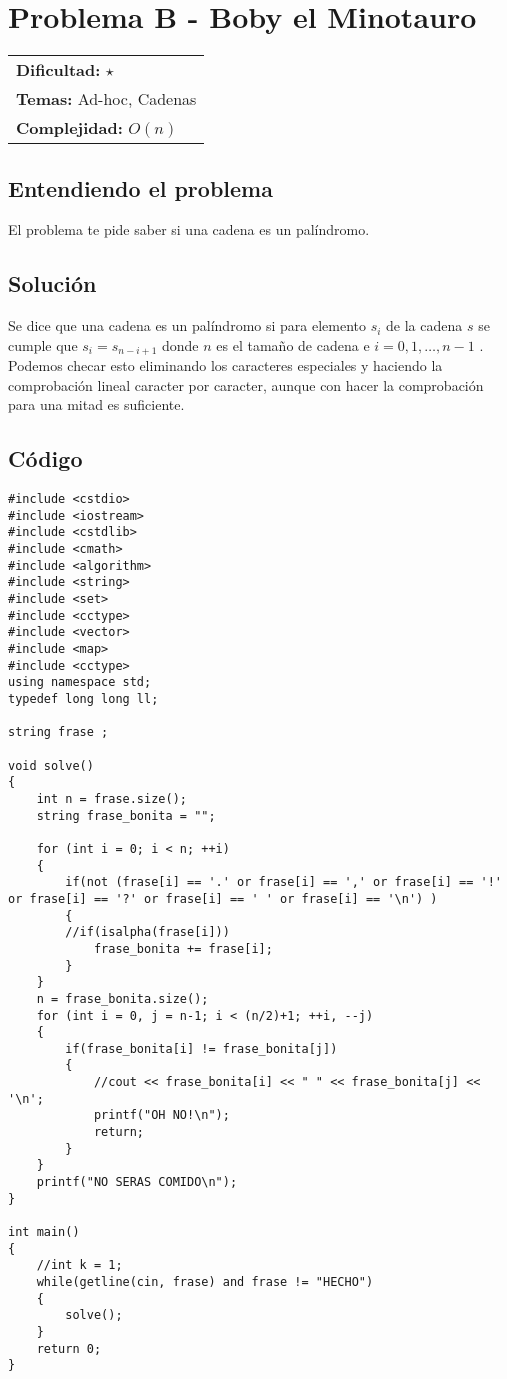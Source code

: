 \section{Problema B - Boby el Minotauro}

\hfill
\begin{tabular}{@{}l@{}}
\textbf{Dificultad:} $\star$ \\
\textbf{Temas:} Ad-hoc, Cadenas \\
\textbf{Complejidad:} $O(n)$
\end{tabular}

\subsection*{Entendiendo el problema}
El problema te pide saber si una cadena es un palíndromo.
\subsection*{Solución}
Se dice que una cadena es un palíndromo si para elemento $s_i$ de la cadena $s$ se cumple que $s_i = s_{n-i+1}$ donde $n$ es el tamaño de cadena e $i = 0, 1, \dots, n-1$ . Podemos checar esto eliminando los caracteres especiales y haciendo la comprobación lineal caracter por caracter, aunque con hacer la comprobación para una mitad es suficiente.
\subsection*{Código}

\begin{verbatim}
#include <cstdio>
#include <iostream>
#include <cstdlib>
#include <cmath>
#include <algorithm>
#include <string>
#include <set>
#include <cctype>
#include <vector>
#include <map>
#include <cctype>
using namespace std;
typedef long long ll;

string frase ;

void solve()
{
	int n = frase.size();
	string frase_bonita = "";

	for (int i = 0; i < n; ++i)
	{
		if(not (frase[i] == '.' or frase[i] == ',' or frase[i] == '!' or frase[i] == '?' or frase[i] == ' ' or frase[i] == '\n') )
		{
		//if(isalpha(frase[i]))
			frase_bonita += frase[i];
		}
	}
	n = frase_bonita.size();
	for (int i = 0, j = n-1; i < (n/2)+1; ++i, --j)
	{
		if(frase_bonita[i] != frase_bonita[j])
		{
			//cout << frase_bonita[i] << " " << frase_bonita[j] << '\n';
			printf("OH NO!\n");
			return;
		}
	}
	printf("NO SERAS COMIDO\n");
}

int main()
{
    //int k = 1;
	while(getline(cin, frase) and frase != "HECHO")
	{
		solve();
	}
	return 0;
}
\end{verbatim}


